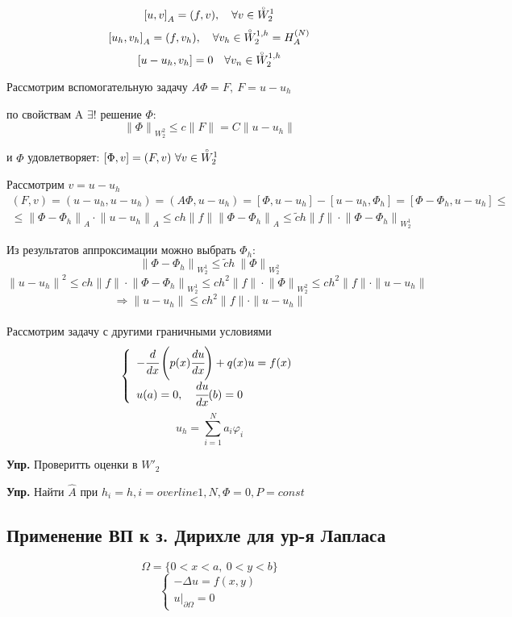\documentclass[12pt, a4paper]{article}
\newcommand{\Sum}{\sum\limits}
\begin{document}
\[ {[u, v]}_A = (f, v), \quad \forall v \in \accentset{\circ}{W}_2^{1} \]
\[ {[u_h, v_h]}_A = (f, v_h), \quad  \forall v_h \in \accentset{\circ}{W}_2^{1, h} = H_A^{(N)} \]
\[ [u - u_h, v_h] = 0 \quad \forall v_n \in \accentset{\circ}{W}_2^{1, h} \]

Рассмотрим вспомогательную задачу $ A \Phi = F, \ F = u - u_h $

по свойствам A $\exists!$ решение $\Phi$:
\[ {\|\Phi\|}_{W^2_2} \leq c \|F\| = C \|u - u_h\| \]

и $ \Phi $ удовлетворяет: $[\Phi, v] = (F, v) \ \forall v \in \accentset{\circ}{W}_2^{1} $

Рассмотрим $ v = u - u_h $
\begin{multline*}
	(F, v) = (u - u_h, u - u_h) = (A \Phi, u - u_h) = [\Phi, u - u_h] - [u - u_h, \Phi_h] = [\Phi - \Phi_h, u - u_h] \leq \\
	\leq {\|\Phi - \Phi_h\|}_A \cdot {\|u - u_h\|}_A \leq ch \|f\| {\|\Phi - \Phi_h\|}_A \leq \tilde{c} h \|f\| \cdot {\|\Phi - \Phi_h\|}_{W_2^1}
\end{multline*}

Из результатов аппроксимации можно выбрать $ \Phi_h $:
\[ {\|\Phi - \Phi_h\|}_{{W}_2^1} \leq \tilde{c} h \ {\|\Phi\|}_{W^2_2} \]
\[ {\|u-u_h\|}^2 \leq ch {\|f\|} \cdot {\|\Phi- \Phi_h\|}_{{W}_2^1} \leq ch^2 \|f\| \cdot {\|\Phi\|}_{W_2^2} \leq ch^2 \|f\| \cdot \|u - u_h\| \]
\[ \Rightarrow \|u - u_h\| \leq ch^2 \|f\| \cdot \|u - u_h\| \] \\

Рассмотрим задачу с другими граничными условиями
\[ \left\{ \begin{array}{l}
    -\cfrac{d}{dx} \left(p(x) \cfrac{du}{dx}\right) + q(x) u = f(x) \\
    u(a) = 0, \quad \cfrac{du}{dx}(b) = 0
\end{array} \right. \]
\[ u_h = \Sum_{i=1}^N a_i \varphi_i \]

\textbf{Упр.} Проверитть оценки в $ {W'}_2 $

\textbf{Упр.} Найти $ \hat{A} $ при $ h_i = h, i = overline{1, N}, \Phi = 0, P = const $

\subsection{Применение ВП к з. Дирихле для ур-я Лапласа}
\[ \Omega = \{0 < x < a, \ 0 < y < b\} \] 
\[ \left\{ \begin{array}{l}
		- \Delta u = f(x, y) \\
		u|_{\partial \Omega} = 0
\end{array}  \right. \]
\end{document}
